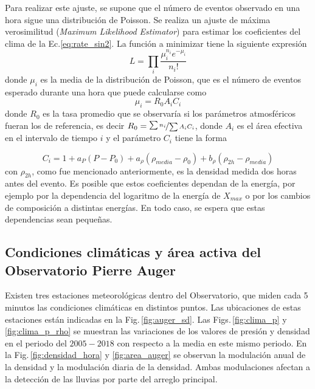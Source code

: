 Para realizar este ajuste, se supone que el número de eventos observado en una hora sigue una distribución de Poisson. Se realiza un ajuste de máxima verosimilitud (\emph{Maximum Likelihood Estimator}) para estimar los coeficientes del clima de la Ec.\ref{eq:rate_sin2}. La función a minimizar tiene la siguiente expresión 
\begin{equation}
	L=\prod_i\frac{\mu_i^{n_i} e^{-\mu_i}}{n_i!}
\end{equation}
donde $\mu_i$ es la media de la distribución de Poisson, que es el número de eventos esperado durante una hora que puede calcularse como
\begin{equation}
	\mu_i = R_0A_iC_i
\end{equation}
donde $R_0$ es la tasa promedio que se observaría si los parámetros atmosféricos fueran los de referencia, es decir $R_0=\nicefrac{\sum n_i}{\sum A_iC_i}$, donde $A_i$ es el área efectiva en el intervalo de tiempo $i$ y el parámetro $C_i$ tiene la forma

\begin{equation}
	C_i = 1+a_P(P-P_0) +a_{\rho}(\rho_{media}-\rho_0) + b_{\rho}(\rho_{2h}-\rho_{media}) 
\end{equation}
con $\rho_{2h}$, como fue mencionado anteriormente, es la densidad medida dos horas antes del evento. Es posible que estos coeficientes dependan de la energía, por ejemplo por la dependencia del logaritmo de la energía de $X_{max}$ o por los cambios de composición a distintas energías. En todo caso, se espera que estas dependencias sean pequeñas.

\subsection{Condiciones climáticas y área activa del Observatorio Pierre Auger}

Existen tres estaciones meteorológicas dentro del Observatorio, que miden cada 5 minutos las condiciones climáticas en distintos puntos. Las ubicaciones de estas estaciones están indicadas en la Fig.\,\ref{fig:auger_sd}. Las Figs.\,\ref{fig:clima_p} y \ref{fig:clima_p_rho} se muestran las variaciones de los valores de presión y densidad en el periodo del $2005-2018$ con respecto a la media en este mismo periodo. En la Fig.\,\ref{fig:densidad_hora} y \ref{fig:area_auger} se observan la modulación anual de la densidad y la modulación diaria de la densidad. Ambas modulaciones afectan a la detección de las lluvias por parte del arreglo principal. 


